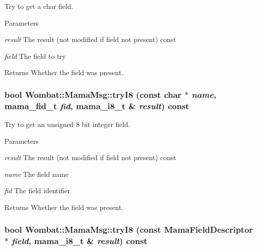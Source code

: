 Try to get a char field. 
\begin{DoxyParams}{Parameters}
\item[{\em result}]The result (not modified if field not present) const \item[{\em field}]The field to try \end{DoxyParams}
\begin{DoxyReturn}{Returns}
Whether the field was present. 
\end{DoxyReturn}
\hypertarget{classWombat_1_1MamaMsg_a0b8113df59fbd274e7ad0e5a2786ec54}{
\subsubsection[{tryI8}]{\setlength{\rightskip}{0pt plus 5cm}bool Wombat::MamaMsg::tryI8 (const char $\ast$ {\em name}, \/  mama\_\-fid\_\-t {\em fid}, \/  mama\_\-i8\_\-t \& {\em result}) const}}
\label{classWombat_1_1MamaMsg_a0b8113df59fbd274e7ad0e5a2786ec54}


Try to get an unsigned 8 bit integer field. 
\begin{DoxyParams}{Parameters}
\item[{\em result}]The result (not modified if field not present) const \item[{\em name}]The field name \item[{\em fid}]The field identifier \end{DoxyParams}
\begin{DoxyReturn}{Returns}
Whether the field was present. 
\end{DoxyReturn}
\hypertarget{classWombat_1_1MamaMsg_ac05be633c3737f9bdb3feccee8aab2e6}{
\subsubsection[{tryI8}]{\setlength{\rightskip}{0pt plus 5cm}bool Wombat::MamaMsg::tryI8 (const {\bf MamaFieldDescriptor} $\ast$ {\em field}, \/  mama\_\-i8\_\-t \& {\em result}) const}}
\label{classWombat_1_1MamaMsg_ac05be633c3737f9bdb3feccee8aab2e6}


